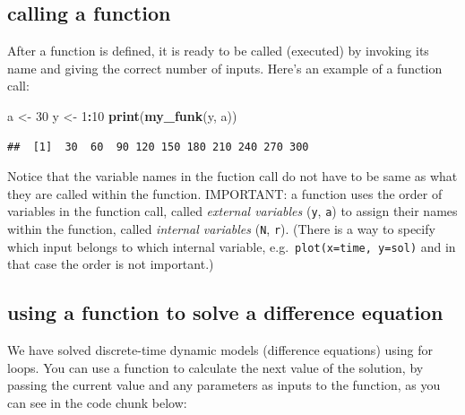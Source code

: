 \documentclass[
]{book}
\newenvironment{Shaded}{\begin{snugshade}}{\end{snugshade}}
\newcommand{\DecValTok}[1]{\textcolor[rgb]{0.00,0.00,0.81}{#1}}
\newcommand{\KeywordTok}[1]{\textcolor[rgb]{0.13,0.29,0.53}{\textbf{#1}}}
\newcommand{\NormalTok}[1]{#1}
\newcommand{\OperatorTok}[1]{\textcolor[rgb]{0.81,0.36,0.00}{\textbf{#1}}}
\newcommand{\StringTok}[1]{\textcolor[rgb]{0.31,0.60,0.02}{#1}}
\theoremstyle{definition}
\theoremstyle{definition}
\theoremstyle{definition}
\theoremstyle{remark}
\begin{document}
\hypertarget{calling-a-function}{%
\subsection{calling a function}\label{calling-a-function}}

After a function is defined, it is ready to be called (executed) by invoking its name and giving the correct number of inputs. Here's an example of a function call:

\begin{Shaded}
\begin{Highlighting}[]
\NormalTok{a \textless{}{-}}\StringTok{ }\DecValTok{30}
\NormalTok{y \textless{}{-}}\StringTok{ }\DecValTok{1}\OperatorTok{:}\DecValTok{10}
\KeywordTok{print}\NormalTok{(}\KeywordTok{my\_funk}\NormalTok{(y, a))}
\end{Highlighting}
\end{Shaded}

\begin{verbatim}
##  [1]  30  60  90 120 150 180 210 240 270 300
\end{verbatim}

Notice that the variable names in the fuction call do not have to be same as what they are called within the function. IMPORTANT: a function uses the order of variables in the function call, called \emph{external variables} (\texttt{y}, \texttt{a}) to assign their names within the function, called \emph{internal variables} (\texttt{N}, \texttt{r}). (There is a way to specify which input belongs to which internal variable, e.g.~\texttt{plot(x=time,\ y=sol)} and in that case the order is not important.)

\hypertarget{using-a-function-to-solve-a-difference-equation}{%
\subsection{using a function to solve a difference equation}\label{using-a-function-to-solve-a-difference-equation}}

We have solved discrete-time dynamic models (difference equations) using for loops. You can use a function to calculate the next value of the solution, by passing the current value and any parameters as inputs to the function, as you can see in the code chunk below:
\end{document}
